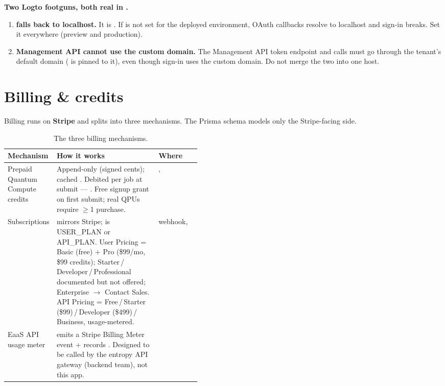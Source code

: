 \documentclass[11pt]{article}
\begin{document}
\medskip
\noindent\textbf{Two Logto footguns, both real in .}
\begin{enumerate}
\item \textbf{ falls back to localhost.} It is .
If  is not set for the deployed environment, OAuth callbacks resolve to localhost and sign-in
breaks. Set it everywhere (preview and production).
\item \textbf{Management API cannot use the custom domain.} The Management API token endpoint and calls must go through
the tenant's default  domain ( is pinned to it), even though sign-in uses the
custom domain. Do not merge the two into one host.
\end{enumerate}

\section{Billing \& credits}\label{sec:billing}
Billing runs on \textbf{Stripe} and splits into three mechanisms. The Prisma schema models only the Stripe-facing side.

\begin{table}[h]
\centering\small
\begin{tabularx}{\linewidth}{@{}>{\raggedright\arraybackslash}p{0.22\linewidth} Y >{\raggedright\arraybackslash}p{0.22\linewidth}@{}}
\toprule
\textbf{Mechanism} & \textbf{How it works} & \textbf{Where}\\
\midrule
Prepaid Quantum Compute credits & Append-only  (signed cents); cached
. Debited per job at submit --- . Free signup grant
on first submit; real QPUs require $\geq$1 purchase. & , \\
Subscriptions &  mirrors Stripe;  is USER\_PLAN or API\_PLAN. User Pricing = Basic (free) + Pro
(\$99/mo, \$99 credits); Starter\,/\,Developer\,/\,Professional documented but not offered; Enterprise $\to$ Contact
Sales. API Pricing = Free\,/\,Starter (\$99)\,/\,Developer (\$499)\,/\,Business, usage-metered. & webhook,
\\
EaaS API usage meter &  emits a Stripe Billing Meter event + records . Designed to
be called by the entropy API gateway (backend team), not this app. & \\
\bottomrule
\end{tabularx}
\caption{The three billing mechanisms.}
\end{table}
\end{document}
